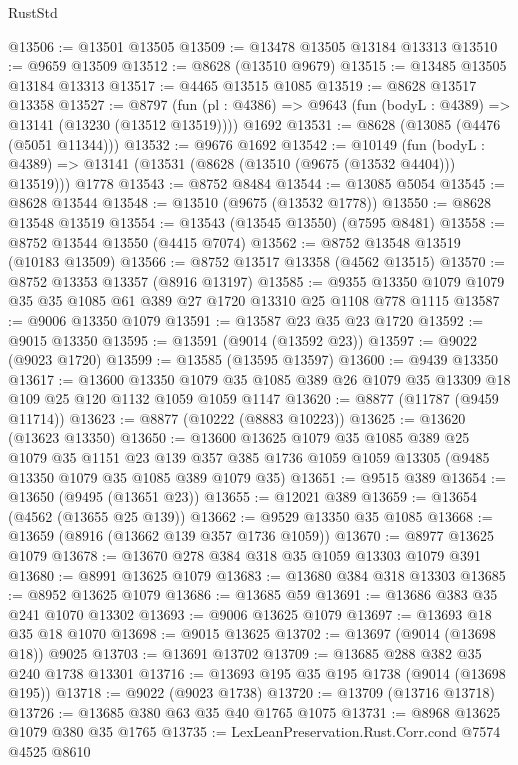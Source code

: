 \begin{lexlean}{RustStd}
\begin{coremodule}
@13506 := @13501 @13505
@13509 := @13478 @13505 @13184 @13313
@13510 := @9659 @13509
@13512 := @8628 (@13510 @9679)
@13515 := @13485 @13505 @13184 @13313
@13517 := @4465 @13515 @1085
@13519 := @8628 @13517 @13358
@13527 := @8797
    (fun (pl : @4386) => @9643 (fun (bodyL : @4389) => @13141 (@13230 (@13512 @13519))))
    @1692
@13531 := @8628 (@13085 (@4476 (@5051 @11344)))
@13532 := @9676 @1692
@13542 := @10149
    (fun (bodyL : @4389) => @13141 (@13531 (@8628 (@13510 (@9675 (@13532 @4404))) @13519)))
    @1778
@13543 := @8752 @8484
@13544 := @13085 @5054
@13545 := @8628 @13544
@13548 := @13510 (@9675 (@13532 @1778))
@13550 := @8628 @13548 @13519
@13554 := @13543 (@13545 @13550) (@7595 @8481)
@13558 := @8752 @13544 @13550 (@4415 @7074)
@13562 := @8752 @13548 @13519 (@10183 @13509)
@13566 := @8752 @13517 @13358 (@4562 @13515)
@13570 := @8752 @13353 @13357 (@8916 @13197)
@13585 := @9355 @13350 @1079 @1079 @35 @35 @1085 @61 @389 @27 @1720 @13310 @25 @1108 @778 @1115
@13587 := @9006 @13350 @1079
@13591 := @13587 @23 @35 @23 @1720
@13592 := @9015 @13350
@13595 := @13591 (@9014 (@13592 @23))
@13597 := @9022 (@9023 @1720)
@13599 := @13585 (@13595 @13597)
@13600 := @9439 @13350
@13617 := @13600
    @13350
    @1079
    @35
    @1085
    @389
    @26
    @1079
    @35
    @13309
    @18
    @109
    @25
    @120
    @1132
    @1059
    @1059
    @1147
@13620 := @8877 (@11787 (@9459 @11714))
@13623 := @8877 (@10222 (@8883 @10223))
@13625 := @13620 (@13623 @13350)
@13650 := @13600
    @13625
    @1079
    @35
    @1085
    @389
    @25
    @1079
    @35
    @1151
    @23
    @139
    @357
    @385
    @1736
    @1059
    @1059
    @13305
    (@9485 @13350 @1079 @35 @1085 @389 @1079 @35)
@13651 := @9515 @389
@13654 := @13650 (@9495 (@13651 @23))
@13655 := @12021 @389
@13659 := @13654 (@4562 (@13655 @25 @139))
@13662 := @9529 @13350 @35 @1085
@13668 := @13659 (@8916 (@13662 @139 @357 @1736 @1059))
@13670 := @8977 @13625 @1079
@13678 := @13670 @278 @384 @318 @35 @1059 @13303 @1079 @391
@13680 := @8991 @13625 @1079
@13683 := @13680 @384 @318 @13303
@13685 := @8952 @13625 @1079
@13686 := @13685 @59
@13691 := @13686 @383 @35 @241 @1070 @13302
@13693 := @9006 @13625 @1079
@13697 := @13693 @18 @35 @18 @1070
@13698 := @9015 @13625
@13702 := @13697 (@9014 (@13698 @18)) @9025
@13703 := @13691 @13702
@13709 := @13685 @288 @382 @35 @240 @1738 @13301
@13716 := @13693 @195 @35 @195 @1738 (@9014 (@13698 @195))
@13718 := @9022 (@9023 @1738)
@13720 := @13709 (@13716 @13718)
@13726 := @13685 @380 @63 @35 @40 @1765 @1075
@13731 := @8968 @13625 @1079 @380 @35 @1765
@13735 := LexLeanPreservation.Rust.Corr.cond @7574 @4525 @8610

\end{coremodule}
\end{lexlean}
